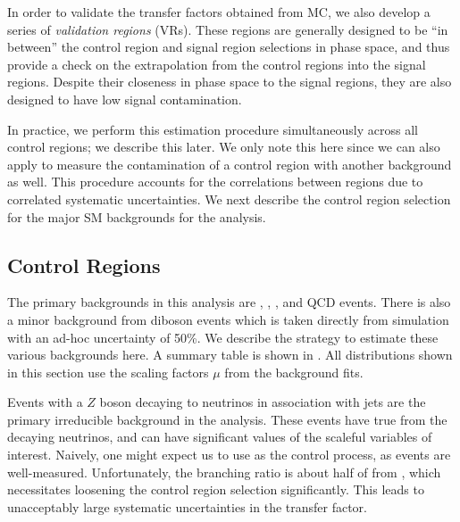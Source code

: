 In order to validate the transfer factors obtained from MC, we also develop a series of \textit{validation regions} (VRs).
These regions are generally designed to be ``in between'' the control region and signal region selections in phase space, and thus provide a check on the extrapolation from the control regions into the signal regions.
Despite their closeness in phase space to the signal regions, they are also designed to have low signal contamination.

In practice, we perform this estimation procedure simultaneously across all control regions; we describe this later.
We only note this here since we can also apply  to measure the contamination of a control region with another background as well.
This procedure accounts for the correlations between regions due to correlated systematic uncertainties.
We next describe the control region selection for the major SM backgrounds for the analysis.


\subsection{Control Regions}

The primary backgrounds in this analysis are \zjets, \wjets, \ttbar, and QCD events.
There is also a minor background from diboson events which is taken directly from simulation with an ad-hoc uncertainty of 50\%.
We describe the strategy to estimate these various backgrounds here.
A summary table is shown in .
All distributions shown in this section use the scaling factors $\mu$ from the background fits.


Events with a $Z$ boson decaying to neutrinos in association with jets are the primary irreducible background in the analysis.
These events have true \met from the decaying neutrinos, and can have significant values of the scaleful variables of interest.
Naively, one might expect us to use \Zll as the control process, as \Zll events are well-measured.
Unfortunately, the \Zll branching ratio is about half of from \Zvv, which necessitates loosening the control region selection significantly.
This leads to unacceptably large systematic uncertainties in the transfer factor.

